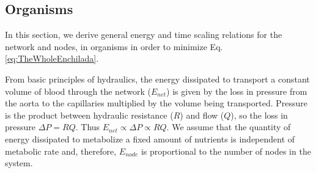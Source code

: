 \documentclass[12pt]{article}
\begin{document}




\subsection{Organisms}
\label{sec:organisms}

In this section, we derive general energy and time scaling relations 
for the network and nodes, in organisms in order to minimize Eq. \ref{eq:TheWholeEnchilada}.  

From basic principles of hydraulics, the energy dissipated to transport a
constant volume of blood through the network ($E_{net}$) is given by the loss
in pressure from the aorta to the capillaries multiplied by the volume being
transported.  Pressure is the product between hydraulic resistance ($R$) and
flow ($Q$), so the loss in pressure $\Delta P = RQ$.  Thus $E_{net} \propto
\Delta P \propto RQ$.
We assume that the quantity of energy dissipated to metabolize a fixed amount
of nutrients is independent of metabolic rate and, therefore, $E_{node}$ is
proportional to the number of nodes in the system.   
\end{document}
